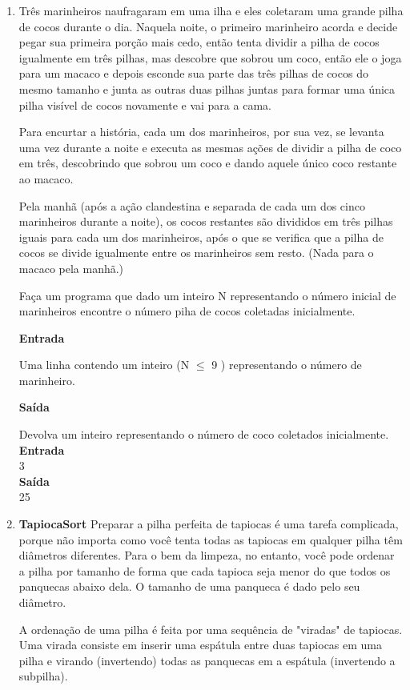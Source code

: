 \begin{enumerate}
\item Três marinheiros naufragaram em uma ilha e eles coletaram uma grande pilha de cocos durante o dia. Naquela noite, o primeiro marinheiro acorda e decide pegar sua primeira porção mais cedo, então tenta dividir a pilha de cocos igualmente em três pilhas, mas descobre que sobrou um coco, então ele o joga para um macaco e depois esconde sua parte das três pilhas de cocos do mesmo tamanho e junta as outras duas pilhas juntas para formar uma única pilha visível de cocos novamente e vai para a cama.

Para encurtar a história, cada um dos marinheiros, por sua vez, se levanta uma vez durante a noite e executa as mesmas ações de dividir a pilha de coco em três, descobrindo que sobrou um coco e dando aquele único coco restante ao macaco.

Pela manhã (após a ação clandestina e separada de cada um dos cinco marinheiros durante a noite), os cocos restantes são divididos em três pilhas iguais para cada um dos marinheiros, após o que se verifica que a pilha de cocos se divide igualmente entre os marinheiros sem resto. (Nada para o macaco pela manhã.)

Faça um programa que dado um inteiro N representando o número inicial de marinheiros encontre o número piha de cocos coletadas inicialmente. 

\textbf{Entrada}

Uma linha contendo um inteiro (N  $\leq$ 9 ) representando o número de marinheiro.

\textbf{Saída}

Devolva um inteiro representando o número de coco coletados inicialmente.\\

\textbf{Entrada}\\
3\\

\textbf{Saída} \\
25\\

\item \textbf{TapiocaSort} Preparar a pilha perfeita de tapiocas é uma tarefa complicada, porque não importa como você tenta todas as tapiocas em qualquer pilha têm diâmetros diferentes. Para o bem da limpeza, no entanto, você pode ordenar a pilha por tamanho de forma que cada tapioca seja menor do que todos os panquecas abaixo dela. O tamanho de uma panqueca é dado pelo seu diâmetro.

A ordenação de uma pilha é feita por uma sequência de "viradas" de tapiocas. Uma virada consiste em inserir uma espátula entre duas tapiocas em uma pilha e virando (invertendo) todas as panquecas em a espátula (invertendo a subpilha).


\end{enumerate}
